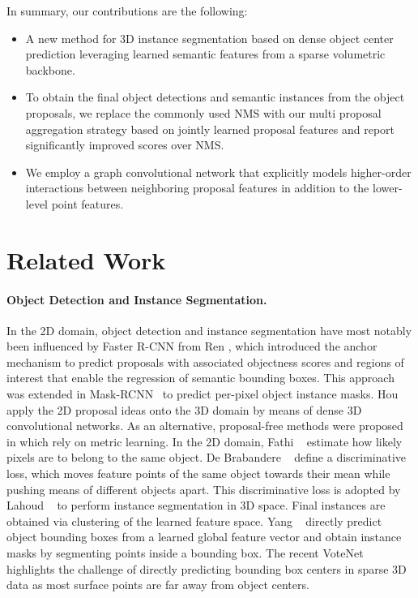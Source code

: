 \documentclass[10pt,twocolumn,letterpaper]{article}
\newcommand{\parag}[1]{\vspace{0px}\paragraph{#1}\hspace{-9pt}}
\begin{document}
In summary, our contributions are the following:
\begin{itemize}
    \item A new method for 3D instance segmentation based on dense object center prediction leveraging learned semantic features from a sparse volumetric backbone.
    \item To obtain the final object detections and semantic instances from the object proposals, we replace the commonly used NMS with our multi proposal aggregation strategy based on jointly learned proposal features and report significantly improved scores over NMS.
    \item We employ a graph convolutional network that explicitly models higher-order interactions between neighboring proposal features in addition to the lower-level point features.
\end{itemize} \section{Related Work}
\parag{Object Detection and Instance Segmentation.}
In the 2D domain, object detection and instance segmentation have most notably been influenced by Faster R-CNN from Ren \etal\cite{Shaoqing15NIPS}, which introduced the anchor mechanism to predict proposals with associated objectness scores and regions of interest that enable the regression of semantic bounding boxes.
This approach was extended in Mask-RCNN~\cite{He17ICCV} to predict per-pixel object instance masks.
Hou \etal~\cite{Hou19CVPR} apply the 2D proposal ideas onto the 3D domain by means of dense 3D convolutional networks.
As an alternative, proposal-free methods were proposed in \cite{Brabandere17CVPRW, Fathi17CoRR, Lahoud19ICCV} which rely on metric learning.
In the 2D domain, Fathi \etal~\cite{Fathi17CoRR} estimate how likely pixels are to belong to the same object.
De Brabandere \etal ~\cite{Brabandere17CVPRW} define a discriminative loss, which moves feature points of the same object towards their mean while pushing means of different objects apart.
This discriminative loss is adopted by Lahoud \etal ~\cite{Lahoud19ICCV} to perform instance segmentation in 3D space.
Final instances are obtained via clustering of the learned feature space.
Yang \etal~\cite{Yang19CVPR} directly predict object bounding boxes from a learned global feature vector and obtain instance masks by segmenting points inside a bounding box. 
The recent VoteNet~\cite{Qi19ICCV} highlights the challenge of directly predicting bounding box centers in sparse 3D data as most surface points are far away from object centers.
\end{document}
